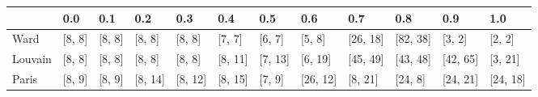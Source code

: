 \begin{tabular}{llllllllllll}
\toprule
{} &     0.0 &     0.1 &      0.2 &      0.3 &      0.4 &      0.5 &       0.6 &       0.7 &       0.8 &       0.9 &       1.0 \\
\midrule
Ward    &  [8, 8] &  [8, 8] &   [8, 8] &   [8, 8] &   [7, 7] &   [6, 7] &    [5, 8] &  [26, 18] &  [82, 38] &    [3, 2] &    [2, 2] \\
Louvain &  [8, 8] &  [8, 8] &   [8, 8] &   [8, 8] &  [8, 11] &  [7, 13] &   [6, 19] &  [45, 49] &  [43, 48] &  [42, 65] &   [3, 21] \\
Paris   &  [8, 9] &  [8, 9] &  [8, 14] &  [8, 12] &  [8, 15] &   [7, 9] &  [26, 12] &   [8, 21] &   [24, 8] &  [24, 21] &  [24, 18] \\
\bottomrule
\end{tabular}
